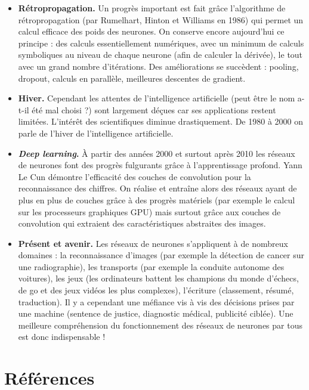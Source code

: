 \documentclass[11pt,class=report,crop=false]{standalone}
\begin{document}
\begin{itemize}
  \item \textbf{Rétropropagation.} Un progrès important est fait grâce l'algorithme de rétropropagation (par Rumelhart, Hinton et Williams en 1986) qui permet un calcul efficace des poids des neurones. On conserve encore aujourd'hui ce principe : des calculs essentiellement numériques, avec un minimum de calculs symboliques au niveau de chaque neurone (afin de calculer la dérivée), le tout avec un grand nombre d'itérations. Des améliorations se succèdent : pooling, dropout, calculs en parallèle, meilleures descentes de gradient.
  
  \item \textbf{Hiver.} Cependant les attentes de l'intelligence artificielle (peut être le nom a-t-il été mal choisi ?) sont largement déçues car ses applications restent limitées. L'intérêt des scientifiques diminue drastiquement. De 1980 à 2000 on parle de l'hiver de l'intelligence artificielle.
  
  \item \textbf{\emph{Deep learning}.} À partir des années 2000 et surtout après 2010 les réseaux de neurones font des progrès fulgurants grâce à l'apprentissage profond. Yann Le Cun démontre l'efficacité des couches de convolution pour la reconnaissance des chiffres. On réalise et entraîne alors des réseaux ayant de plus en plus de couches grâce à des progrès matériels (par exemple le calcul sur les processeurs graphiques GPU) mais surtout grâce aux couches de convolution qui extraient des caractéristiques abstraites des images.  
  
  \item \textbf{Présent et avenir.} Les réseaux de neurones s'appliquent à de nombreux domaines : la reconnaissance d'images (par exemple la détection de cancer sur une radiographie), les transports (par exemple la conduite autonome des voitures), les jeux (les ordinateurs battent les champions du monde d'échecs, de go et des jeux vidéos les plus complexes), l'écriture (classement, résumé, traduction).
  Il y a cependant une méfiance vis à vis des décisions prises par une machine (sentence de justice, diagnostic médical, publicité ciblée). Une meilleure compréhension du fonctionnement des réseaux de neurones par tous est donc indispensable !
\end{itemize}


\section{Références}
\end{document}
